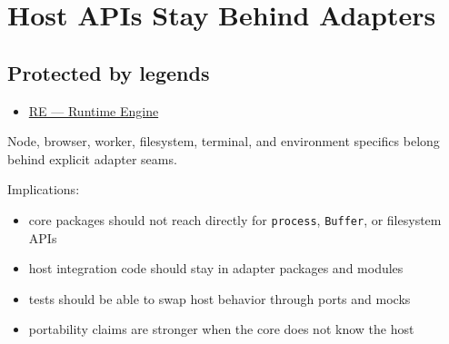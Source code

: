 \chapter{Host APIs Stay Behind Adapters}\label{record-046}

\smallskip

\section{Protected by legends}\label{record-046-protected-by-legends}

\begin{itemize}
\tightlist
\item
  \href{https://github.com/flyingrobots/bijou/blob/1853ad902f6bf219326409e7f743a5a1d6517dbc/docs/legends/RE-runtime-engine.md}{RE --- Runtime Engine}
\end{itemize}

Node, browser, worker, filesystem, terminal, and environment specifics belong behind explicit adapter seams.

Implications:

\begin{itemize}
\tightlist
\item
  core packages should not reach directly for \texttt{p\allowbreak{}r\allowbreak{}o\allowbreak{}c\allowbreak{}e\allowbreak{}s\allowbreak{}s}, \texttt{B\allowbreak{}u\allowbreak{}f\allowbreak{}f\allowbreak{}e\allowbreak{}r}, or filesystem APIs
\item
  host integration code should stay in adapter packages and modules
\item
  tests should be able to swap host behavior through ports and mocks
\item
  portability claims are stronger when the core does not know the host
\end{itemize}

